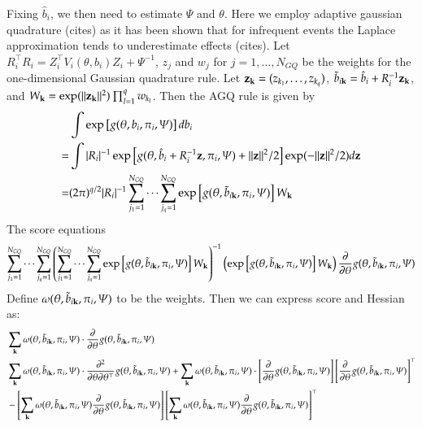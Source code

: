 \documentclass[12pt]{amsart}
\def\k{{\bf k}}
\def\z{{\bf z}}
\begin{document}
Fixing $\hat b_i$, we then need to estimate $\Psi$ and $\theta$. Here we employ adaptive gaussian quadrature (cites) as it has been shown that for infrequent events the Laplace approximation tends to underestimate effects (cites).  Let $R_i^\top R_i = Z_i^\top V_i (\theta, b_i) Z_i + \Psi^{-1}$, $z_j$ and $w_j$ for $j=1,\ldots, N_{GQ}$ be the weights for the one-dimensional Gaussian quadrature rule.  Let $\z_\k = (z_{k_1},\ldots, z_{k_q})$, $\tilde b_{i \k} = \hat b_i + R_i^{-1} \z_\k$, and $W_{\k} = \exp ( \| \z_\k \|^2 ) \prod_{l=1}^{q} w_{k_l}$.  Then the AGQ rule is given by
$$
\begin{aligned}
&\int \exp \left[ g(\theta, b_i, \pi_{i}, \Psi) \right] db_i \\
=& \int | R_i |^{-1} \exp \left[ g(\theta, \hat b_i + R_i^{-1} \z, \pi_{i}, \Psi) + \| \z \|^2 / 2 \right] \exp ( - \| \z \|^2 / 2 ) d\z \\
=& (2 \pi)^{q/2} | R_i |^{-1} \sum_{j_1 =1}^{N_{GQ}} \cdots \sum_{j_q =1}^{N_{GQ}} \exp \left[ g(\theta, \tilde b_{i \k}, \pi_{i}, \Psi) \right] W_{\k}
\end{aligned}
$$
The score equations
$$
\sum_{j_1 =1}^{N_{GQ}} \cdots \sum_{j_q =1}^{N_{GQ}}
\left( \sum_{j_1 =1}^{N_{GQ}} \cdots \sum_{j_q =1}^{N_{GQ}} \exp \left[ g(\theta, \tilde b_{i \k}, \pi_{i}, \Psi) \right] W_{\k} \right)^{-1}
\left( \exp \left[ g(\theta, \tilde b_{i \k}, \pi_{i}, \Psi) \right] W_{\k} \right) \frac{\partial}{\partial \theta} g(\theta, \tilde b_{i \k}, \pi_i, \Psi)
$$
Define $\omega(\theta, \tilde b_{i \k}, \pi_i, \Psi)$ to be the weights.  Then we can express score and Hessian as:
$$
\begin{aligned}
&\sum_{\k} \omega(\theta, \tilde b_{i \k}, \pi_i, \Psi) \cdot \frac{\partial}{\partial \theta} g(\theta, \tilde b_{i \k}, \pi_i, \Psi) \\
&\sum_{\k}
\omega(\theta, \tilde b_{i \k}, \pi_i, \Psi) \cdot \frac{\partial^2}{\partial \theta \partial \theta^\top} g(\theta, \tilde b_{i \k}, \pi_i, \Psi) +
\sum_{\k} \omega(\theta, \tilde b_{i \k}, \pi_i, \Psi) \cdot \left [\frac{\partial}{\partial \theta} g(\theta, \tilde b_{i \k}, \pi_i, \Psi) \right] \left [\frac{\partial}{\partial \theta} g(\theta, \tilde b_{i \k}, \pi_i, \Psi) \right]^\top \\
&- \left[ \sum_{\k} \omega(\theta, \tilde b_{i \k}, \pi_i, \Psi) \frac{\partial}{\partial \theta} g(\theta, \tilde b_{i \k}, \pi_i, \Psi) \right] \left[ \sum_{\k} \omega(\theta, \tilde b_{i \k}, \pi_i, \Psi) \frac{\partial}{\partial \theta} g(\theta, \tilde b_{i \k}, \pi_i, \Psi) \right]^\top
\end{aligned}
$$
\end{document}
